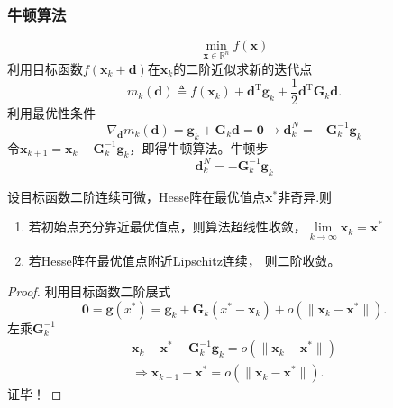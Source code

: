 \subsubsection{牛顿算法}
\[
    \min\limits_{\boldsymbol{x}\in\mathbb{R}^n}f(\boldsymbol{x})
\]
利用目标函数$f(\boldsymbol{x}_k+\boldsymbol{d})$在$\boldsymbol{x}_k$的二阶近似求新的迭代点
\[
    m_k(\boldsymbol{d})\triangleq f(\boldsymbol{x}_k)+\boldsymbol{d}^\mathrm{T}\boldsymbol{g}_k+\frac{1}{2}\boldsymbol{d}^\mathrm{T}\boldsymbol{G}_k\boldsymbol{d}.
\]
利用最优性条件
\[
    \nabla_{\boldsymbol{d}} m_{k}(\boldsymbol{d}) = \boldsymbol{g}_{k}+\boldsymbol{G}_{k}\boldsymbol{d} = \boldsymbol{0} \longrightarrow \boldsymbol{d}_{k}^{N} = -\boldsymbol{G}_{k}^{-1}\boldsymbol{g}_{k}  
\]
令$\boldsymbol{x}_{k+1} = \boldsymbol{x}_{k}-\boldsymbol{G}_{k}^{-1}\boldsymbol{g}_{k}$，即得牛顿算法。牛顿步
\[
    \boldsymbol{d}_{k}^{N} = -\boldsymbol{G}_{k}^{-1}\boldsymbol{g}_{k}
\]
\begin{theorem}
    设目标函数二阶连续可微，Hesse阵在最优值点$\boldsymbol{x}^*$非奇异.则
    \begin{enumerate}
        \item 若初始点充分靠近最优值点，则算法超线性收敛，$\lim\limits_{k\to\infty}\boldsymbol{x}_{k} = \boldsymbol{x}^*$                          
        \item 若Hesse阵在最优值点附近Lipschitz连续， 则二阶收敛。
    \end{enumerate}
\end{theorem}
\begin{proof}
    利用目标函数二阶展式
    \[
        \mathbf{0}=\boldsymbol{g}(x^*)=\boldsymbol{g}_k+\boldsymbol{G}_k(x^*-\boldsymbol{x}_k)+o(\|\boldsymbol{x}_k-\boldsymbol{x}^*\|).
    \]
    左乘$\boldsymbol{G}_{k}^{-1}$
    \[
        \begin{array}{l}
            \boldsymbol{x}_k-\boldsymbol{x}^*-\boldsymbol{G}_k^{-1}\boldsymbol{g}_k=o(\|\boldsymbol{x}_k-\boldsymbol{x}^*\|)\\
            \Rightarrow \boldsymbol{x}_{k+1}-\boldsymbol{x}^{*}=o(\|\boldsymbol{x}_{k}-\boldsymbol{x}^{*}\|). 
        \end{array}
    \]
    证毕！
\end{proof}
